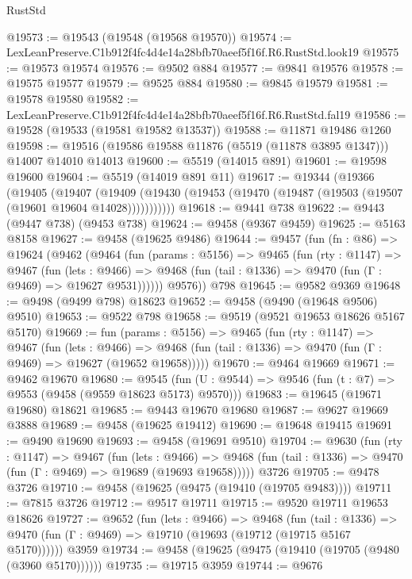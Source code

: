 \begin{lexlean}{RustStd}
\begin{coremodule}
@19573 := @19543 (@19548 (@19568 @19570))
@19574 := LexLeanPreserve.C1b912f4fc4d4e14a28bfb70aeef5f16f.R6.RustStd.look19
@19575 := @19573 @19574
@19576 := @9502 @884
@19577 := @9841 @19576
@19578 := @19575 @19577
@19579 := @9525 @884
@19580 := @9845 @19579
@19581 := @19578 @19580
@19582 := LexLeanPreserve.C1b912f4fc4d4e14a28bfb70aeef5f16f.R6.RustStd.fal19
@19586 := @19528 (@19533 (@19581 @19582 @13537))
@19588 := @11871 @19486 @1260
@19598 := @19516 (@19586 @19588 @11876 (@5519 (@11878 @3895 @1347))) @14007 @14010 @14013
@19600 := @5519 (@14015 @891)
@19601 := @19598 @19600
@19604 := @5519 (@14019 @891 @11)
@19617 := @19344
    (@19366
      (@19405
        (@19407
          (@19409 (@19430 (@19453 (@19470 (@19487 (@19503 (@19507 (@19601 @19604 @14028)))))))))))
@19618 := @9441 @738
@19622 := @9443 (@9447 @738) (@9453 @738)
@19624 := @9458 (@9367 @9459)
@19625 := @5163 @8158
@19627 := @9458 (@19625 @9486)
@19644 := @9457
    (fun (fn : @86) =>
    @19624
      (@9462
        (@9464
          (fun (params : @5156) =>
          @9465
            (fun (rty : @1147) =>
            @9467
              (fun (lets : @9466) =>
              @9468 (fun (tail : @1336) => @9470 (fun (Γ : @9469) => @19627 @9531))))))
        @9576))
    @798
@19645 := @9582 @9369
@19648 := @9498 (@9499 @798) @18623
@19652 := @9458 (@9490 (@19648 @9506) @9510)
@19653 := @9522 @798
@19658 := @9519 (@9521 @19653 @18626 @5167 @5170)
@19669 := fun (params : @5156) =>
  @9465
    (fun (rty : @1147) =>
    @9467
      (fun (lets : @9466) =>
      @9468 (fun (tail : @1336) => @9470 (fun (Γ : @9469) => @19627 (@19652 @19658)))))
@19670 := @9464 @19669
@19671 := @9462 @19670
@19680 := @9545
    (fun (U : @9544) => @9546 (fun (t : @7) => @9553 (@9458 (@9559 @18623 @5173) @9570)))
@19683 := @19645 (@19671 @19680) @18621
@19685 := @9443 @19670 @19680
@19687 := @9627 @19669 @3888
@19689 := @9458 (@19625 @19412)
@19690 := @19648 @19415
@19691 := @9490 @19690
@19693 := @9458 (@19691 @9510)
@19704 := @9630
    (fun (rty : @1147) =>
    @9467
      (fun (lets : @9466) =>
      @9468 (fun (tail : @1336) => @9470 (fun (Γ : @9469) => @19689 (@19693 @19658)))))
    @3726
@19705 := @9478 @3726
@19710 := @9458 (@19625 (@9475 (@19410 (@19705 @9483))))
@19711 := @7815 @3726
@19712 := @9517 @19711
@19715 := @9520 @19711 @19653 @18626
@19727 := @9652
    (fun (lets : @9466) =>
    @9468
      (fun (tail : @1336) =>
      @9470 (fun (Γ : @9469) => @19710 (@19693 (@19712 (@19715 @5167 @5170))))))
    @3959
@19734 := @9458 (@19625 (@9475 (@19410 (@19705 (@9480 (@3960 @5170))))))
@19735 := @19715 @3959
@19744 := @9676

\end{coremodule}
\end{lexlean}
